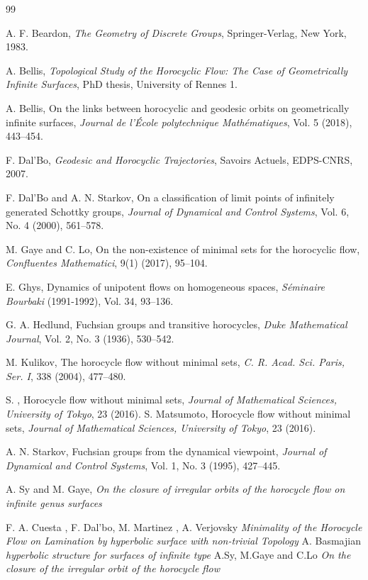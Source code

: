 \documentclass[11pt]{amsart}
\begin{document}
\newpage
\begin{thebibliography}{99}

A. F. Beardon, \textit{The Geometry of Discrete Groups}, Springer-Verlag, New York, 1983.

A. Bellis, \textit{Topological Study of the Horocyclic Flow: The Case of Geometrically Infinite Surfaces}, PhD thesis, University of Rennes 1.

A. Bellis, On the links between horocyclic and geodesic orbits on geometrically infinite surfaces, \textit{Journal de l’École polytechnique Mathématiques}, Vol. 5 (2018), 443–454.

F. Dal’Bo, \textit{Geodesic and Horocyclic Trajectories}, Savoirs Actuels, EDPS-CNRS, 2007.

F. Dal’Bo and A. N. Starkov, On a classification of limit points of infinitely generated Schottky groups, \textit{Journal of Dynamical and Control Systems}, Vol. 6, No. 4 (2000), 561–578.

M. Gaye and C. Lo, On the non-existence of minimal sets for the horocyclic flow, \textit{Confluentes Mathematici}, 9(1) (2017), 95–104.

E. Ghys, Dynamics of unipotent flows on homogeneous spaces, \textit{Séminaire Bourbaki} (1991-1992), Vol. 34, 93–136.

G. A. Hedlund, Fuchsian groups and transitive horocycles, \textit{Duke Mathematical Journal}, Vol. 2, No. 3 (1936), 530–542.

M. Kulikov, The horocycle flow without minimal sets, \textit{C. R. Acad. Sci. Paris, Ser. I}, 338 (2004), 477–480.

S. , Horocycle flow without minimal sets, \textit{Journal of Mathematical Sciences, University of Tokyo}, 23 (2016).
S. Matsumoto, Horocycle flow without minimal sets, \textit{Journal of Mathematical Sciences, University of Tokyo}, 23 (2016).

A. N. Starkov, Fuchsian groups from the dynamical viewpoint, \textit{Journal of Dynamical and Control Systems}, Vol. 1, No. 3 (1995), 427–445.

 A. Sy and M. Gaye, \textit{On the closure of irregular orbits of the horocycle flow on infinite genus surfaces}

 F. A. Cuesta ,  F. Dal'bo, M. Martinez , A. Verjovsky \textit{Minimality of the Horocycle Flow on Lamination by hyperbolic surface with non-trivial Topology}
 A. Basmajian \textit{ hyperbolic structure for surfaces of infinite type}
 A.Sy, M.Gaye and C.Lo \textit{On the closure of the irregular orbit of the horocycle flow}

\end{thebibliography}
\end{document}
